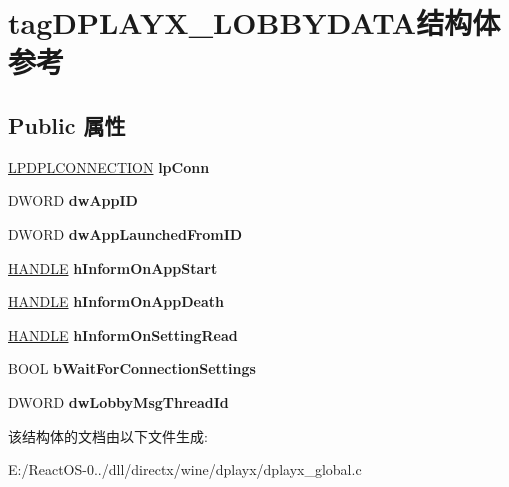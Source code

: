 \hypertarget{structtag_d_p_l_a_y_x___l_o_b_b_y_d_a_t_a}{}\section{tag\+D\+P\+L\+A\+Y\+X\+\_\+\+L\+O\+B\+B\+Y\+D\+A\+T\+A结构体 参考}
\label{structtag_d_p_l_a_y_x___l_o_b_b_y_d_a_t_a}
\subsection*{Public 属性}
\begin{DoxyCompactItemize}
\item 
\mbox{\label{structtag_d_p_l_a_y_x___l_o_b_b_y_d_a_t_a_a40f229956da4135c2fd93b41a57dfa1d}} 
\hyperlink{structtag_d_p_l_c_o_n_n_e_c_t_i_o_n}{L\+P\+D\+P\+L\+C\+O\+N\+N\+E\+C\+T\+I\+ON} {\bfseries lp\+Conn}
\item 
\mbox{\label{structtag_d_p_l_a_y_x___l_o_b_b_y_d_a_t_a_ad40e4586a1f1c9be511a368fa2905900}} 
D\+W\+O\+RD {\bfseries dw\+App\+ID}
\item 
\mbox{\label{structtag_d_p_l_a_y_x___l_o_b_b_y_d_a_t_a_adf83c5b195de6fe5d11bba5de256e68e}} 
D\+W\+O\+RD {\bfseries dw\+App\+Launched\+From\+ID}
\item 
\mbox{\label{structtag_d_p_l_a_y_x___l_o_b_b_y_d_a_t_a_aea53e92f2426369f62494a2042f6ca94}} 
\hyperlink{interfacevoid}{H\+A\+N\+D\+LE} {\bfseries h\+Inform\+On\+App\+Start}
\item 
\mbox{\label{structtag_d_p_l_a_y_x___l_o_b_b_y_d_a_t_a_afea29b72e441f0222af83b0584d380d4}} 
\hyperlink{interfacevoid}{H\+A\+N\+D\+LE} {\bfseries h\+Inform\+On\+App\+Death}
\item 
\mbox{\label{structtag_d_p_l_a_y_x___l_o_b_b_y_d_a_t_a_ae121d8d75d91e6212a2e6e7682d31285}} 
\hyperlink{interfacevoid}{H\+A\+N\+D\+LE} {\bfseries h\+Inform\+On\+Setting\+Read}
\item 
\mbox{\label{structtag_d_p_l_a_y_x___l_o_b_b_y_d_a_t_a_a2faa568ca98fc444a6634284b7fcd84f}} 
B\+O\+OL {\bfseries b\+Wait\+For\+Connection\+Settings}
\item 
\mbox{\label{structtag_d_p_l_a_y_x___l_o_b_b_y_d_a_t_a_a6d1ee7da9686a13a6ce981623ed32b2f}} 
D\+W\+O\+RD {\bfseries dw\+Lobby\+Msg\+Thread\+Id}
\end{DoxyCompactItemize}


该结构体的文档由以下文件生成\+:\begin{DoxyCompactItemize}
\item 
E\+:/\+React\+O\+S-\/0../dll/directx/wine/dplayx/dplayx\+\_\+global.\+c\end{DoxyCompactItemize}
